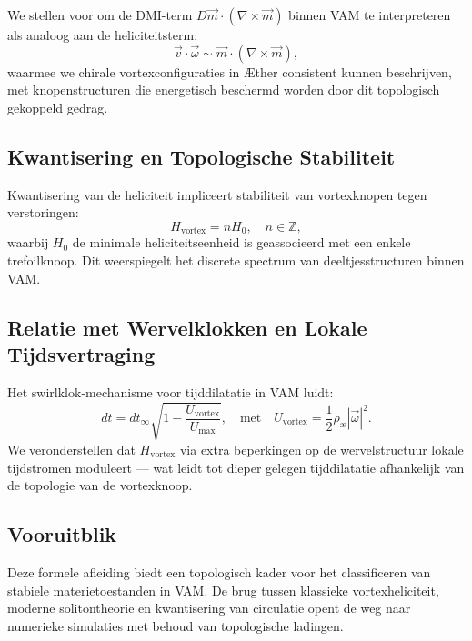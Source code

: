 We stellen voor om de DMI-term $D \vec{m} \cdot (\nabla \times \vec{m})$ binnen VAM te interpreteren als analoog aan de heliciteitsterm:
\begin{equation}
    \vec{v} \cdot \vec{\omega} \sim \vec{m} \cdot (\nabla \times \vec{m}),
\end{equation}
waarmee we chirale vortexconfiguraties in Æther consistent kunnen beschrijven, met knopenstructuren die energetisch beschermd worden door dit topologisch gekoppeld gedrag.

\subsection{Kwantisering en Topologische Stabiliteit}

Kwantisering van de heliciteit impliceert stabiliteit van vortexknopen tegen verstoringen:
\begin{equation}
    H_\text{vortex} = n H_0, \quad n \in \mathbb{Z},
\end{equation}
waarbij $H_0$ de minimale heliciteitseenheid is geassocieerd met een enkele trefoilknoop. Dit weerspiegelt het discrete spectrum van deeltjesstructuren binnen VAM.

\subsection{Relatie met Wervelklokken en Lokale Tijdsvertraging}

Het swirlklok-mechanisme voor tijddilatatie in VAM luidt:
\begin{equation}
    dt = dt_\infty \sqrt{1 - \frac{U_\text{vortex}}{U_\text{max}}},
    \quad \text{met} \quad
    U_\text{vortex} = \frac{1}{2} \rho_\text{\ae} |\vec{\omega}|^2.
\end{equation}
We veronderstellen dat $H_\text{vortex}$ via extra beperkingen op de wervelstructuur lokale tijdstromen moduleert — wat leidt tot dieper gelegen tijddilatatie afhankelijk van de topologie van de vortexknoop.

\subsection{Vooruitblik}

Deze formele afleiding biedt een topologisch kader voor het classificeren van stabiele materietoestanden in VAM. De brug tussen klassieke vortexheliciteit, moderne solitontheorie en kwantisering van circulatie opent de weg naar numerieke simulaties met behoud van topologische ladingen.